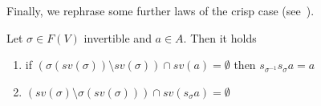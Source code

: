 \documentclass{llncs}
\def\monop{\otimes}
\begin{document}

Finally, we rephrase some further laws of the crisp case 
(see~\cite[p.140]{pippo}).

\begin{lemma}
	\label{lemmaSubs}
	Let $\sigma \in F(V)$ invertible and $a \in A$. Then it holds
	\begin{enumerate}
		\item if $(\sigma(sv(\sigma)) \setminus sv(\sigma)) \cap sv(a) = \emptyset$ then $s_{\sigma^{-1}} s_{\sigma} a = a$
		\item $(sv(\sigma) \setminus  \sigma(sv(\sigma))) \cap sv(s_\sigma a) = \emptyset$
	\end{enumerate}
\end{lemma}
\end{document}
